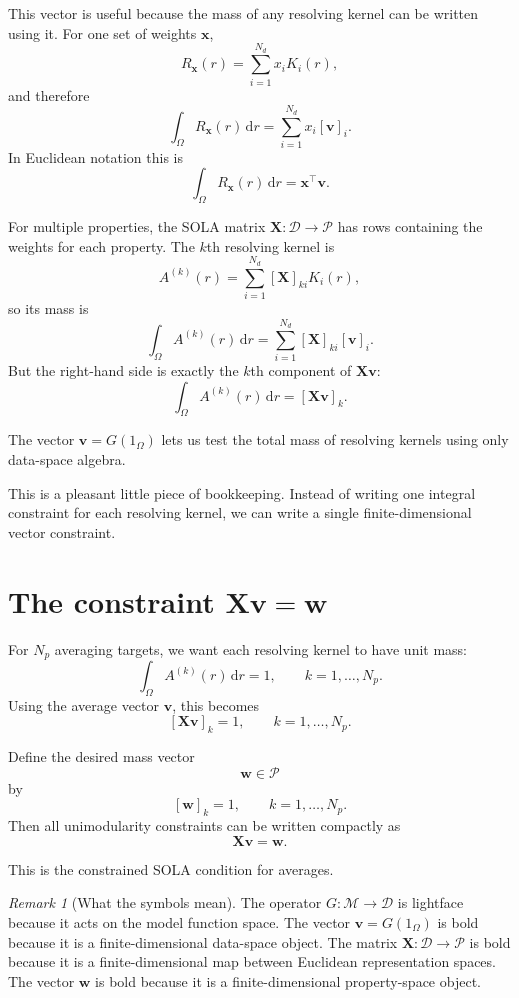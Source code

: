 \documentclass[11pt,openany]{book}
\theoremstyle{definition}
\theoremstyle{remark}
\newtheorem{remark}{Remark}[chapter]
\newcommand{\M}{\mathcal M}
\newcommand{\D}{\mathcal D}
\newcommand{\Pspace}{\mathcal P}
\newcommand{\dd}{\,\mathrm d}
\begin{document}
This vector is useful because the mass of any resolving kernel can be written using it. For one
set of weights \(\mathbf x\),
\[
  R_{\mathbf x}(r)
  =
  \sum_{i=1}^{N_d}x_iK_i(r),
\]
and therefore
\[
  \int_\Omega R_{\mathbf x}(r)\dd r
  =
  \sum_{i=1}^{N_d}x_i[\mathbf v]_i.
\]
In Euclidean notation this is
\[
  \int_\Omega R_{\mathbf x}(r)\dd r
  =
  \mathbf x^\top\mathbf v.
\]

For multiple properties, the SOLA matrix \(\mathbf X:\D\to\Pspace\) has rows containing the
weights for each property. The \(k\)th resolving kernel is
\[
  A^{(k)}(r)
  =
  \sum_{i=1}^{N_d}[\mathbf X]_{ki}K_i(r),
\]
so its mass is
\[
  \int_\Omega A^{(k)}(r)\dd r
  =
  \sum_{i=1}^{N_d}[\mathbf X]_{ki}[\mathbf v]_i.
\]
But the right-hand side is exactly the \(k\)th component of \(\mathbf X\mathbf v\):
\[
  \int_\Omega A^{(k)}(r)\dd r
  =
  [\mathbf X\mathbf v]_k.
\]

\begin{lessonbox}
The vector \(\mathbf v=G(1_\Omega)\) lets us test the total mass of resolving kernels using only
data-space algebra.
\end{lessonbox}

This is a pleasant little piece of bookkeeping. Instead of writing one integral constraint for each
resolving kernel, we can write a single finite-dimensional vector constraint.

\section{The constraint \texorpdfstring{\(\mathbf X\mathbf v=\mathbf w\)}{Xv=w}}

For \(N_p\) averaging targets, we want each resolving kernel to have unit mass:
\[
  \int_\Omega A^{(k)}(r)\dd r=1,
  \qquad k=1,\dots,N_p.
\]
Using the average vector \(\mathbf v\), this becomes
\[
  [\mathbf X\mathbf v]_k=1,
  \qquad k=1,\dots,N_p.
\]

Define the desired mass vector
\[
  \mathbf w\in\Pspace
\]
by
\[
  [\mathbf w]_k=1,
  \qquad k=1,\dots,N_p.
\]
Then all unimodularity constraints can be written compactly as
\[
  \mathbf X\mathbf v=\mathbf w.
\]

This is the constrained SOLA condition for averages.

\begin{remark}[What the symbols mean]
The operator \(G:\M\to\D\) is lightface because it acts on the model function space. The vector
\(\mathbf v=G(1_\Omega)\) is bold because it is a finite-dimensional data-space object. The
matrix \(\mathbf X:\D\to\Pspace\) is bold because it is a finite-dimensional map between
Euclidean representation spaces. The vector \(\mathbf w\) is bold because it is a finite-dimensional
property-space object.
\end{remark}
\end{document}
